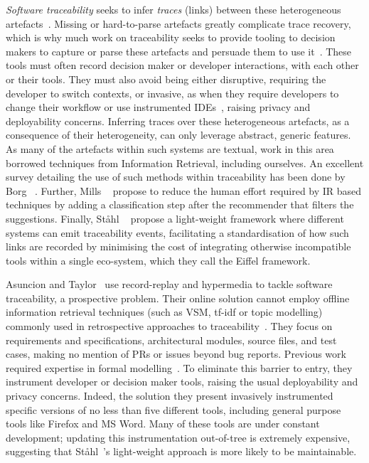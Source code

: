 \emph{Software traceability} seeks to infer \emph{traces} (\ie links) between
these heterogeneous artefacts~\cite{Cleland-Huang2014}. Missing or hard-to-parse
artefacts greatly complicate trace recovery, which is why much work on
traceability seeks to provide tooling to decision makers to capture or parse
these artefacts and persuade them to use it~\cite{Neumuller06, jiralinkdoc,
ghlinkdoc}. These tools must often record decision maker or developer
interactions, with each other or their tools. They must also avoid being either
disruptive, requiring the developer to switch contexts, or invasive, as when
they require developers to change their workflow or use instrumented
IDEs~\cite{TopicTraceability}, raising privacy and deployability concerns.
Inferring traces over these heterogeneous artefacts, as a consequence of their
heterogeneity, can only leverage abstract, generic features. As many of the
artefacts within such systems are textual, work in this area borrowed techniques
from Information Retrieval, including ourselves. An excellent survey detailing
the use of such methods within traceability has been done by Borg
\etal~\cite{Borg2014}. Further, Mills
\etal~\cite{Mills:2017:ATL:3106237.3121280} propose to reduce the human effort
required by IR based techniques by adding a classification step after the
recommender that filters the suggestions. Finally, St{\aa}hl
\etal~\cite{Stahl2017} propose a light-weight framework where different systems
can emit traceability events, facilitating a standardisation of how such links
are recorded by minimising the cost of integrating otherwise incompatible tools
within a single eco-system, which they call the Eiffel framework.

Asuncion and Taylor~\cite{Asuncion:2009:CCL:1556908.1557008} use record-replay
and hypermedia to tackle software traceability, a prospective problem. Their
online solution cannot employ offline information retrieval techniques (such as
VSM, tf-idf or topic modelling) commonly used in retrospective approaches to
traceability~\cite{4249808}. They focus on requirements and specifications,
architectural modules, source files, and test cases, making no mention of PRs or
issues beyond bug reports. Previous work required expertise in formal
modelling~\cite{Pohl96, Pinheiro96}. To eliminate this barrier to entry, they
instrument developer or decision maker tools, raising the usual deployability
and privacy concerns. Indeed, the solution they present invasively instrumented
specific versions of no less than five different tools, including general
purpose tools like Firefox and MS Word. Many of these tools are under constant
development; updating this instrumentation out-of-tree is extremely expensive,
suggesting that St{\aa}hl~\etal's light-weight approach is more likely to be
maintainable.

